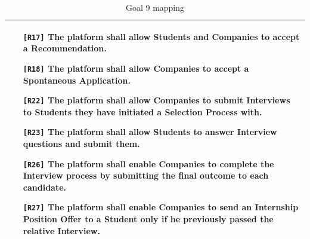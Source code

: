 \begin{table}[H]
\begin{tabular}{|p{15cm}|}
\begin{itemize}
            \item[\texttt{[R17]}] The platform shall allow Students and Companies to accept a Recommendation.
            \item[\texttt{[R18]}] The platform shall allow Companies to accept a Spontaneous Application.
            \item[\texttt{[R22]}] The platform shall allow Companies to submit Interviews to Students they have initiated a Selection Process with.
            \item[\texttt{[R23]}] The platform shall allow Students to answer Interview questions and submit them.
            \item[\texttt{[R26]}] The platform shall enable Companies to complete the Interview process by submitting the final outcome to each candidate.
            \item[\texttt{[R27]}] The platform shall enable Companies to send an Internship Position Offer to a Student only if he previously passed the relative Interview.
        \end{itemize} \\ \hline
    \end{tabular}
    \caption{Goal 9 mapping}
    \label{tab:G9}
\end{table}



